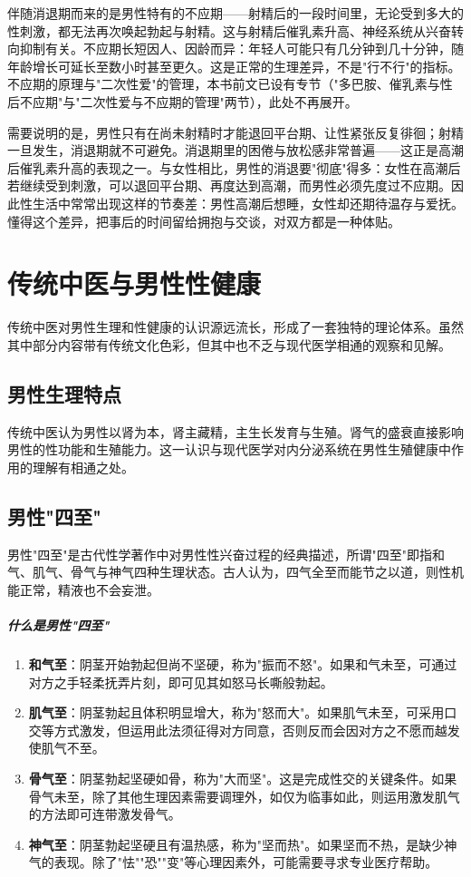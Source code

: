 伴随消退期而来的是男性特有的不应期——射精后的一段时间里，无论受到多大的性刺激，都无法再次唤起勃起与射精。这与射精后催乳素升高、神经系统从兴奋转向抑制有关。不应期长短因人、因龄而异：年轻人可能只有几分钟到几十分钟，随年龄增长可延长至数小时甚至更久。这是正常的生理差异，不是"行不行"的指标。不应期的原理与"二次性爱"的管理，本书前文已设有专节（"多巴胺、催乳素与性后不应期"与"二次性爱与不应期的管理"两节），此处不再展开。

需要说明的是，男性只有在尚未射精时才能退回平台期、让性紧张反复徘徊；射精一旦发生，消退期就不可避免。消退期里的困倦与放松感非常普遍——这正是高潮后催乳素升高的表现之一。与女性相比，男性的消退要"彻底"得多：女性在高潮后若继续受到刺激，可以退回平台期、再度达到高潮，而男性必须先度过不应期。因此性生活中常常出现这样的节奏差：男性高潮后想睡，女性却还期待温存与爱抚。懂得这个差异，把事后的时间留给拥抱与交谈，对双方都是一种体贴。

\section{传统中医与男性性健康}

传统中医对男性生理和性健康的认识源远流长，形成了一套独特的理论体系。虽然其中部分内容带有传统文化色彩，但其中也不乏与现代医学相通的观察和见解。

\subsection{男性生理特点}

传统中医认为男性以肾为本，肾主藏精，主生长发育与生殖。肾气的盛衰直接影响男性的性功能和生殖能力。这一认识与现代医学对内分泌系统在男性生殖健康中作用的理解有相通之处。

\subsection{男性"四至"}

男性"四至"是古代性学著作中对男性性兴奋过程的经典描述，所谓"四至"即指和气、肌气、骨气与神气四种生理状态。古人认为，四气全至而能节之以道，则性机能正常，精液也不会妄泄。

\subparagraph{什么是男性"四至"}

\begin{enumerate}
    \item \textbf{和气至}：阴茎开始勃起但尚不坚硬，称为"振而不怒"。如果和气未至，可通过对方之手轻柔抚弄片刻，即可见其如怒马长嘶般勃起。

    \item \textbf{肌气至}：阴茎勃起且体积明显增大，称为"怒而大"。如果肌气未至，可采用口交等方式激发，但运用此法须征得对方同意，否则反而会因对方之不愿而越发使肌气不至。

    \item \textbf{骨气至}：阴茎勃起坚硬如骨，称为"大而坚"。这是完成性交的关键条件。如果骨气未至，除了其他生理因素需要调理外，如仅为临事如此，则运用激发肌气的方法即可连带激发骨气。

    \item \textbf{神气至}：阴茎勃起坚硬且有温热感，称为"坚而热"。如果坚而不热，是缺少神气的表现。除了"怯""恐""变"等心理因素外，可能需要寻求专业医疗帮助。
\end{enumerate}


